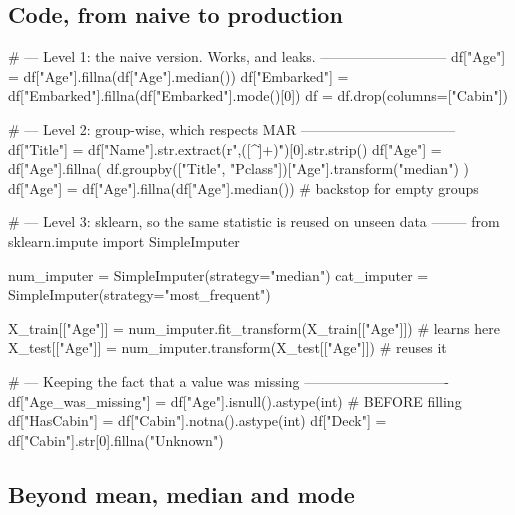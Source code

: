\documentclass[11pt,a4paper]{article}
\begin{document}

\subsection{Code, from naive to production}

\begin{py}
# --- Level 1: the naive version. Works, and leaks. ---------------------------
df["Age"] = df["Age"].fillna(df["Age"].median())
df["Embarked"] = df["Embarked"].fillna(df["Embarked"].mode()[0])
df = df.drop(columns=["Cabin"])

# --- Level 2: group-wise, which respects MAR ---------------------------------
df["Title"] = df["Name"].str.extract(r",\s*([^\.]+)\.")[0].str.strip()
df["Age"] = df["Age"].fillna(
    df.groupby(["Title", "Pclass"])["Age"].transform("median")
)
df["Age"] = df["Age"].fillna(df["Age"].median())   # backstop for empty groups

# --- Level 3: sklearn, so the same statistic is reused on unseen data --------
from sklearn.impute import SimpleImputer

num_imputer = SimpleImputer(strategy="median")
cat_imputer = SimpleImputer(strategy="most_frequent")

X_train[["Age"]] = num_imputer.fit_transform(X_train[["Age"]])  # learns here
X_test[["Age"]]  = num_imputer.transform(X_test[["Age"]])       # reuses it

# --- Keeping the fact that a value was missing -------------------------------
df["Age_was_missing"] = df["Age"].isnull().astype(int)   # BEFORE filling
df["HasCabin"] = df["Cabin"].notna().astype(int)
df["Deck"] = df["Cabin"].str[0].fillna("Unknown")
\end{py}


\subsection{Beyond mean, median and mode}
\end{document}
